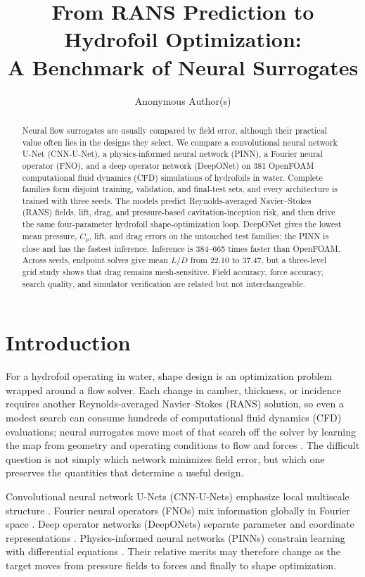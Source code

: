 \documentclass{article}
\title{From RANS Prediction to Hydrofoil Optimization:\\
A Benchmark of Neural Surrogates}
\author{Anonymous Author(s)}
\begin{document}
\maketitle

\begin{abstract}
Neural flow surrogates are usually compared by field error, although their
practical value often lies in the designs they select. We compare a
convolutional neural network U-Net (CNN-U-Net), a physics-informed neural
network (PINN), a Fourier neural operator (FNO), and a deep operator network
(DeepONet) on 381 OpenFOAM computational fluid dynamics (CFD) simulations of
hydrofoils in water. Complete families form disjoint training, validation, and
final-test sets, and every architecture is trained with three seeds. The models
predict Reynolds-averaged Navier--Stokes (RANS) fields, lift, drag, and pressure-based cavitation-inception
risk, and then drive the same four-parameter hydrofoil shape-optimization loop.
DeepONet gives the lowest mean pressure, $C_p$, lift, and drag errors on the
untouched test families; the PINN is close and has the fastest inference.
Inference is 384--665 times faster than OpenFOAM. Across seeds, endpoint solves
give mean $L/D$ from 22.10 to 37.47, but a three-level grid study shows that
drag remains mesh-sensitive. Field accuracy, force accuracy, search quality,
and simulator verification are related but not interchangeable.
\end{abstract}

\section{Introduction}
For a hydrofoil operating in water, shape design is an optimization problem
wrapped around a flow solver. Each change in camber, thickness, or incidence
requires another Reynolds-averaged Navier--Stokes (RANS) solution, so even a modest search can consume hundreds of
computational fluid dynamics (CFD) evaluations; neural surrogates move most of that search off the solver by
learning the map from geometry and operating conditions to flow and forces
\citep{brunton2020machine}. The difficult question is not simply which network
minimizes field error, but which one preserves the quantities that determine a
useful design.

Convolutional neural network U-Nets (CNN-U-Nets) emphasize local multiscale
structure \citep{ronneberger2015unet}. Fourier neural operators (FNOs) mix
information globally in Fourier space \citep{li2021fno,kovachki2023neural}.
Deep operator networks (DeepONets) separate parameter and coordinate
representations \citep{lu2021deeponet}. Physics-informed neural networks
(PINNs) constrain learning with differential equations
\citep{raissi2019pinn}. Their
relative merits may therefore change as the target moves from pressure fields
to forces and finally to shape optimization.
\end{document}
